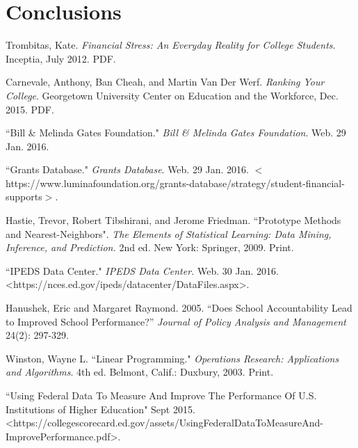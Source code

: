\documentclass[12pt]{scrartcl}
\begin{document}
\section{Conclusions}
\clearpage

\begin{thebibliography}{10}
	 Trombitas, Kate.  \emph{Financial Stress: An Everyday Reality for College Students}. Inceptia, July 2012. PDF. 

	 Carnevale, Anthony, Ban Cheah, and Martin Van Der Werf. \emph{Ranking Your College}. Georgetown University Center on Education and the Workforce, Dec. 2015. PDF.
	
	 ``Bill \& Melinda Gates Foundation." \emph{Bill \& Melinda Gates Foundation}. Web. 29 Jan. 2016. 
	
	 ``Grants Database." \emph{Grants Database}. Web. 29 Jan. 2016. $<$https://www.luminafoundation.org/grants-database/strategy/student-financial-supports$>$. 
	
	 Hastie, Trevor, Robert Tibshirani, and Jerome Friedman. ``Prototype Methods and Nearest-Neighbors". \emph{The Elements of Statistical Learning: Data Mining, Inference, and Prediction.} 2nd ed. New York: Springer, 2009. Print. 

	 ``IPEDS Data Center." \emph{IPEDS Data Center.} Web. 30 Jan. 2016. \textless https://nces.ed.gov/ipeds/datacenter/DataFiles.aspx\textgreater.

	 Hanushek, Eric and Margaret Raymond. 2005. ``Does School Accountability Lead to Improved School Performance?” \emph{Journal of Policy Analysis and Management} 24(2): 297-329.
	
	 Winston, Wayne L. ``Linear Programming."  \emph{Operations Research: Applications and Algorithms}. 4th ed. Belmont, Calif.: Duxbury, 2003. Print.
	
	 ``Using Federal Data To Measure And Improve The Performance Of U.S. Institutions of Higher Education" Sept 2015. \textless https://collegescorecard.ed.gov/assets/UsingFederalDataToMeasureAnd- \\ImprovePerformance.pdf\textgreater.
\end{thebibliography}
\end{document}
